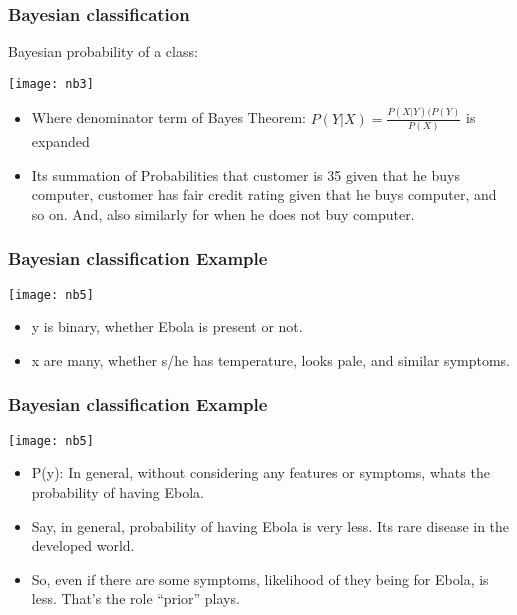 \begin{frame}[fragile]\frametitle{Bayesian classification }
Bayesian probability of a class:
\begin{center}
\texttt{[image: nb3]}
\end{center}
\begin{itemize}
\item Where denominator term of Bayes Theorem: $P(Y|X) = \frac{P(X|Y)(P(Y)}{P(X)}$ is expanded
\item Its summation of Probabilities that customer is 35 given that he buys computer, customer has fair credit rating given that he buys computer, and so on. And, also similarly for when he does not buy computer.
\end{itemize}
\end{frame}

\begin{frame}[fragile]\frametitle{Bayesian classification Example}
\begin{center}
\texttt{[image: nb5]}
\end{center}
\begin{itemize}
\item y is binary, whether Ebola is present or not.
\item x are many, whether s/he has temperature, looks pale, and similar symptoms.
\end{itemize}
\end{frame}

\begin{frame}[fragile]\frametitle{Bayesian classification Example}
\begin{center}
\texttt{[image: nb5]}
\end{center}
\begin{itemize}
\item P(y): In general, without considering any features or symptoms, whats the probability of having Ebola.
\item Say, in general, probability of having Ebola is very less. Its rare disease in the developed world.
\item So, even if there are some symptoms, likelihood of they being for Ebola, is less. That's the role ``prior'' plays.
\end{itemize}
\end{frame}

